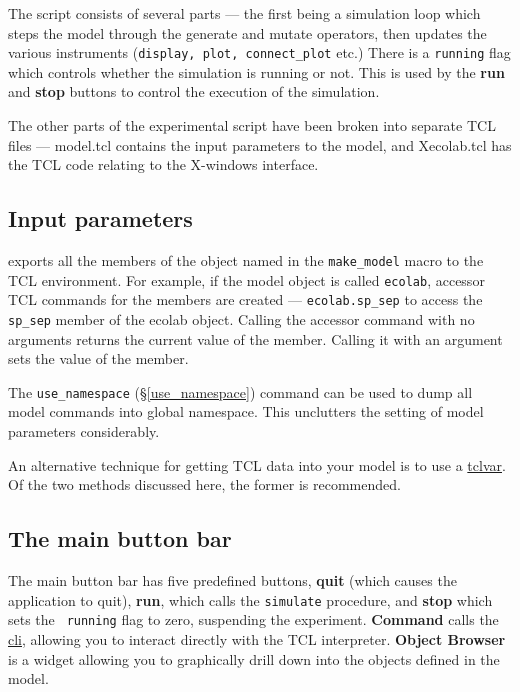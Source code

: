 The script consists of several parts --- the first being a simulation
loop which steps the model through the generate and mutate operators,
then updates the various instruments ({\tt display, plot,
  connect\_plot} etc.) 
There is a {\tt running} flag which controls whether
the simulation is running or not. This is used by the {\bf
  run} and {\bf stop} buttons to control the
execution of the simulation.

The other parts of the experimental script have been broken into
separate TCL files --- model.tcl contains the input
parameters to the model, and Xecolab.tcl has the
TCL code relating to the X-windows interface.

\subsection{Input parameters}

\EcoLab{} exports all the members of the object named in the
\verb+make_model+ macro to the TCL environment. For
example, if the model object is called \verb+ecolab+, accessor
TCL commands for the members are created --- \verb+ecolab.sp_sep+ to
access the \verb+sp_sep+ member of the ecolab object. Calling the
accessor command with no arguments returns the current value of the
member. Calling it with an argument sets the value of the member.

The \verb+use_namespace+ (\S\ref{use_namespace})
command can be used to dump all model commands into global
namespace. This unclutters the setting of model parameters considerably.

An alternative technique for getting TCL data into your model is to
use a \hyperref{{\tt tcl\_var}}{{\tt tcl\_var}
  (\S}{)}{tclvar}. Of the two methods discussed here,
the former is recommended.

\subsection{The main button bar}

The main button bar has five predefined buttons, {\bf
  quit} (which causes the application to quit), {\bf
  run}, which calls the {\tt simulate}
procedure, and {\bf stop} which sets the {\tt
  running} flag to zero, suspending the experiment.
{\bf Command} calls the \hyperref{command line
  interpreter}{(\S}{)}{cli}, allowing you to interact directly with
the TCL interpreter. {\bf Object Browser} is a widget allowing you to
graphically drill down into the objects defined in the model.

